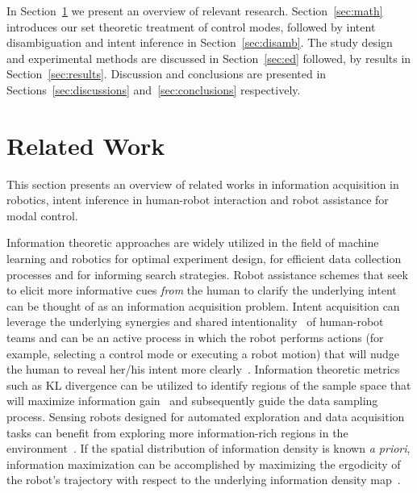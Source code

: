 \documentclass[conference]{IEEEtran}
\begin{document}
In Section~\ref{sec:related_work} we present an overview of relevant research. Section~\ref{sec:math} introduces our set theoretic treatment of control modes, followed by intent disambiguation and intent inference in Section~\ref{sec:disamb}. The study design and experimental methods are discussed in Section~\ref{sec:ed} followed, by results in Section~\ref{sec:results}. Discussion and conclusions are presented in Sections~\ref{sec:discussions} and~\ref{sec:conclusions} respectively. 


\section{Related Work}\label{sec:related_work}
This section presents an overview of related works in information acquisition in robotics, intent inference in human-robot interaction and robot assistance for modal control. 
%

Information theoretic approaches are widely utilized in the field of machine learning and robotics for optimal experiment design, for efficient data collection processes and for informing search strategies. Robot assistance schemes that seek to elicit more informative cues \textit{from} the human to clarify the underlying intent can be thought of as an information acquisition problem. Intent acquisition can leverage the underlying synergies and shared intentionality~\citep{tomasello2007shared} of human-robot teams and can be an active process in which the robot performs actions (for example, selecting a control mode or executing a robot motion) that will nudge the human to reveal her/his intent more clearly~\cite{sadigh2016information, sadigh2016planning}. Information theoretic metrics such as KL divergence can be utilized to identify regions of the sample space that will maximize information gain~\citep{tong2001active} and subsequently guide the data sampling process. Sensing robots designed for automated exploration and data acquisition tasks can benefit from exploring more information-rich regions in the environment~\citep{atanasov2014information}. If the spatial distribution of information density is known \textit{a priori}, information maximization can be accomplished by maximizing the ergodicity of the robot's trajectory with respect to the underlying information density map~\citep{miller2013trajectory, miller2016ergodic}. 
\end{document}
